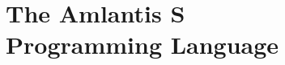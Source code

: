 
\part[The Amlantis S Programming Language]{The Amlantis S \\Programming Language \\ \vspace{1cm} }
\label{part:language-s}
















